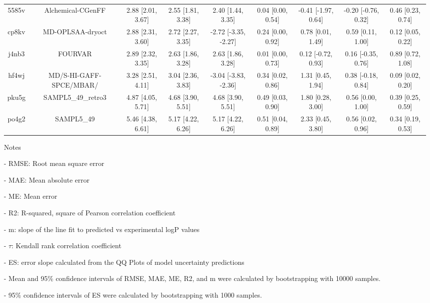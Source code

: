 \documentclass{article}
\begin{document}
\begin{center}
\begin{longtable}{|ccccccccc|}
 5585v &                                  Alchemical-CGenFF &  2.88 [2.01, 3.67] &  2.55 [1.81, 3.38] &     2.40 [1.44, 3.35] &  0.04 [0.00, 0.54] &  -0.41 [-1.97, 0.64] &  -0.20 [-0.76, 0.32] &     0.46 [0.23, 0.74] \\
 cp8kv &                                   MD-OPLSAA-dryoct &  2.88 [2.31, 3.60] &  2.72 [2.27, 3.35] &  -2.72 [-3.35, -2.27] &  0.24 [0.00, 0.92] &    0.78 [0.01, 1.49] &    0.59 [0.11, 1.00] &     0.12 [0.05, 0.22] \\
 j4nb3 &                                            FOURVAR &  2.89 [2.32, 3.35] &  2.63 [1.86, 3.28] &     2.63 [1.86, 3.28] &  0.01 [0.00, 0.73] &   0.12 [-0.72, 0.93] &   0.16 [-0.35, 0.76] &     0.89 [0.72, 1.08] \\
 hf4wj &                            MD/S-HI-GAFF-SPCE/MBAR/ &  3.28 [2.51, 4.11] &  3.04 [2.36, 3.83] &  -3.04 [-3.83, -2.36] &  0.34 [0.02, 0.86] &    1.31 [0.45, 1.94] &   0.38 [-0.18, 0.84] &     0.09 [0.02, 0.20] \\
 pku5g &                                 SAMPL5\_49\_retro3 &  4.87 [4.05, 5.71] &  4.68 [3.90, 5.51] &     4.68 [3.90, 5.51] &  0.49 [0.03, 0.90] &    1.80 [0.28, 3.00] &    0.56 [0.00, 1.00] &     0.39 [0.25, 0.59] \\
 po4g2 &                                         SAMPL5\_49 &  5.46 [4.38, 6.61] &  5.17 [4.22, 6.26] &     5.17 [4.22, 6.26] &  0.51 [0.04, 0.89] &    2.33 [0.45, 3.80] &    0.56 [0.02, 0.96] &     0.34 [0.19, 0.53] \\
\end{longtable}
\end{center}

Notes

- RMSE: Root mean square error

- MAE: Mean absolute error

- ME: Mean error

- R2: R-squared, square of Pearson correlation coefficient

- m: slope of the line fit to predicted vs experimental logP values

- $\tau$:  Kendall rank correlation coefficient

- ES: error slope calculated from the QQ Plots of model uncertainty predictions

- Mean and 95\% confidence intervals of RMSE, MAE, ME, R2, and m were calculated by bootstrapping with 10000 samples.

- 95\% confidence intervals of ES were calculated by bootstrapping with 1000 samples.\end{document}
\end{document}
